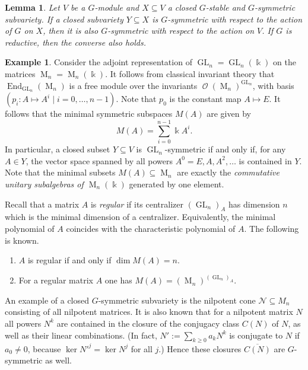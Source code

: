 \documentclass{amsart}
\newtheorem{lem}[thm]{Lemma}
\theoremstyle{definition}
\newtheorem{exa}[thm]{Example}
\theoremstyle{remark}
\begin{document}
\begin{lem}\label{surjectivity-of-VecG.lem}
Let $V$ be a $G$-module and $X {\subseteq} V$ a closed $G$-stable and $G$-symmetric subvariety. If a closed subvariety $Y {\subseteq} X$ is $G$-symmetric with respect to the action of $G$ on $X$, then it is also $G$-symmetric with respect to the action on $V$. If $G$ is reductive, then the converse also holds.
\end{lem}

\begin{exa}
Consider the adjoint representation of ${\operatorname{GL}_{n}}=\operatorname{GL}_{n}({\Bbbk})$ on the matrices $\operatorname{M}_{n}=\operatorname{M}_{n}({\Bbbk})$. It follows from classical invariant theory that $\operatorname{End}_{\operatorname{GL}_{n}}(\operatorname{M}_{n})$ is a free module over the invariants $\operatorname{\mathcal O}(\operatorname{M}_{n})^{\operatorname{GL}_{n}}$, with basis $(p_{i}\colon A \mapsto A^{i}\mid i=0,\ldots,n-1)$. Note that $p_{0}$ is the constant map $A \mapsto E$. It follows that the minimal symmetric subspaces $M(A)$ are given by
$$
M(A) = \sum_{i=0}^{n-1}{\Bbbk} A^{i}.
$$
In particular, a closed subset $Y {\subseteq} V$ is $\operatorname{GL}_{n}$-symmetric if and only if, for any $A \in Y$, the vector space spanned by  all  powers $A^{0}=E, A, A^{2}, \ldots$ is contained in $Y$. Note that the minimal subsets $M(A) {\subseteq} \operatorname{M}_{n}$ are exactly the {\it commutative unitary subalgebras of $\operatorname{M}_{n}({\Bbbk})$} generated by one element.

Recall that a matrix $A$ is {\it regular\/} if its centralizer $({\operatorname{GL}_{n}})_{A}$ has dimension $n$ which is the minimal dimension of a centralizer.  Equivalently, the minimal polynomial of $A$ coincides with the characteristic polynomial of $A$. The following is known. 
\begin{enumerate}
\item
$A$ is regular if and only if $\dim M(A) = n$.
\item
For a regular matrix  $A$ one has $M(A) = (\operatorname{M}_{n})^{(\operatorname{GL}_{n})_{A}}$. 
\end{enumerate}
An example of a closed $G$-symmetric subvariety is the nilpotent cone ${\mathcal N}{\subseteq} M_{n}$ consisting of all nilpotent matrices. It is also known that for a nilpotent matrix $N$ all powers $N^{k}$ are contained in the closure of the conjugacy class $C(N)$ of $N$, as well as their linear combinations. (In fact, $N':=\sum_{k\geq0}a_{k}N^{k}$ is conjugate to $N$ if $a_{0}\neq 0$, because $\ker {N'}^{j}=\ker N^{j}$ for all $j$.)  Hence these closures $\overline{C(N)}$ are $G$-symmetric as well.
\end{exa}
\end{document}
